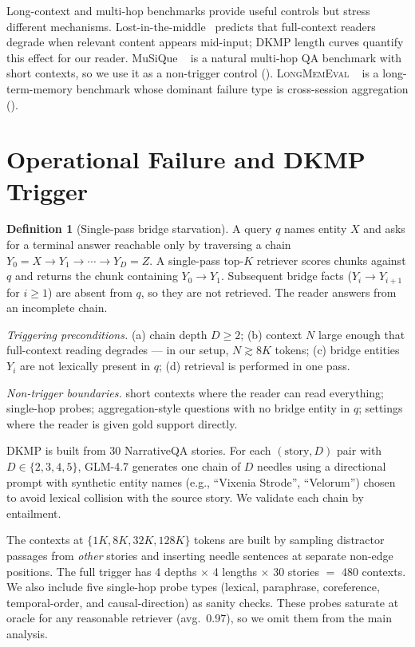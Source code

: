 \documentclass{article}
\theoremstyle{plain}
\theoremstyle{definition}
\newtheorem{definition}[theorem]{Definition}
\newcommand{\dkmp}{\textsc{DKMP}}
\newcommand{\lm}{\textsc{LongMemEval}}
\begin{document}
Long-context and multi-hop benchmarks provide useful controls but stress
different mechanisms. Lost-in-the-middle~\cite{liu2024lostmiddle} predicts
that full-context readers degrade when relevant content appears mid-input;
\dkmp{} length curves quantify this effect for our reader. MuSiQue
~\cite{musique} is a natural multi-hop QA benchmark with short contexts,
so we use it as a non-trigger control (). \lm{}
~\cite{wu2024longmemeval} is a long-term-memory benchmark whose dominant
failure type is cross-session aggregation ().

\section{Operational Failure and \dkmp{} Trigger}\label{sec:dkmp}

\begin{definition}[Single-pass bridge starvation]
\label{def:bridge-starvation}
A query $q$ names entity $X$ and asks for a terminal answer reachable only
by traversing a chain $Y_0{=}X \to Y_1 \to \cdots \to Y_D{=}Z$.
A single-pass top-$K$ retriever scores chunks against $q$ and returns the
chunk containing $Y_0{\to}Y_1$. Subsequent bridge facts
($Y_i{\to}Y_{i+1}$ for $i\ge1$) are absent from $q$, so they are not
retrieved. The reader answers from an incomplete chain.

\smallskip
\textit{Triggering preconditions.}
(a) chain depth $D \ge 2$;
(b) context $N$ large enough that full-context reading degrades --- in our
setup, $N \gtrsim 8K$ tokens;
(c) bridge entities $Y_i$ are not lexically present in $q$;
(d) retrieval is performed in one pass.

\smallskip
\textit{Non-trigger boundaries.}
short contexts where the reader can read everything;
single-hop probes; aggregation-style questions with no bridge entity in $q$;
settings where the reader is given gold support directly.
\end{definition}

\dkmp{} is built from 30 NarrativeQA stories. For each
$(\text{story}, D)$ pair with $D \in \{2,3,4,5\}$, GLM-4.7 generates one
chain of $D$ needles using a directional prompt with synthetic entity names
(e.g., ``Vixenia Strode'', ``Velorum'') chosen to avoid lexical collision
with the source story. We validate each chain by entailment.

The contexts at $\{1K, 8K, 32K, 128K\}$ tokens are built by sampling
distractor passages from \emph{other} stories and inserting needle
sentences at separate non-edge positions. The full trigger has
4 depths $\times$ 4 lengths $\times$ 30 stories $=$ 480 contexts. We also
include five single-hop probe types (lexical, paraphrase, coreference,
temporal-order, and causal-direction) as sanity checks. These probes
saturate at oracle for any reasonable retriever (avg.\ 0.97), so we omit
them from the main analysis.
\end{document}
